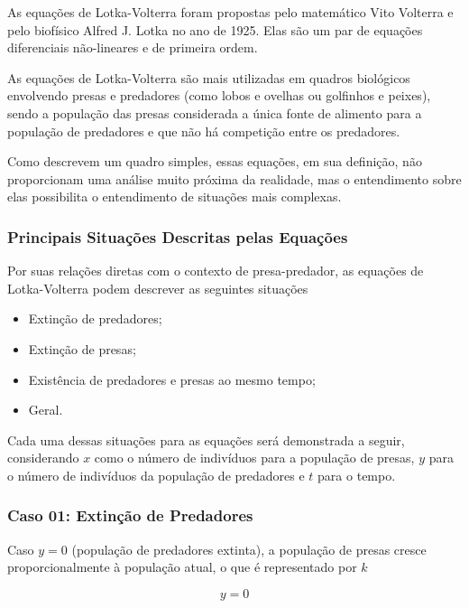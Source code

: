         		As equações de Lotka-Volterra foram propostas pelo matemático Vito Volterra e pelo biofísico Alfred J. Lotka no ano de 1925. Elas são um par de equações diferenciais não-lineares e de primeira ordem.
        		 
        		As equações de Lotka-Volterra são mais utilizadas em quadros biológicos envolvendo presas e predadores (como lobos e ovelhas ou golfinhos e peixes), sendo a população das presas considerada a única fonte de alimento para a população de predadores e que não há competição entre os predadores. 
        		
        		Como descrevem um quadro simples, essas equações, em sua definição, não proporcionam uma análise muito próxima da realidade, mas o entendimento sobre elas possibilita o entendimento de situações mais complexas.
		
	        \subsubsection{Principais Situações Descritas pelas Equações}
        		
        		Por suas relações diretas com o contexto de presa-predador, as equações de Lotka-Volterra podem descrever as seguintes situações
		
        		\begin{itemize}
        			\item Extinção de predadores;
        			\item Extinção de presas;
        			\item Existência de predadores e presas ao mesmo tempo;
        			\item Geral.
        		\end{itemize} 
	
        		Cada uma dessas situações para as equações será demonstrada a seguir, considerando $x$ como o número de indivíduos para a população de presas, $y$ para o número de indivíduos da população de predadores e $t$ para o tempo.
		
		    \subsubsection{Caso 01: Extinção de Predadores}
    			
    			Caso $y = 0$ (população de predadores extinta), a população de presas cresce proporcionalmente à população atual, o que é representado por $k$
    			
    				\[y = 0\]
    				
